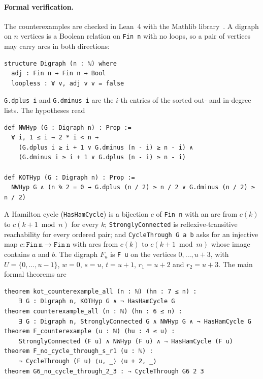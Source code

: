 \documentclass[11pt]{article}
\begin{document}
\paragraph{Formal verification.} The counterexamples are checked in Lean~4 with the Mathlib library~\cite{Lean,Mathlib}. A digraph on $n$ vertices is a Boolean relation on \texttt{Fin n} with no loops, so a pair of vertices may carry arcs in both directions:
\begin{verbatim}
structure Digraph (n : ℕ) where
  adj : Fin n → Fin n → Bool
  loopless : ∀ v, adj v v = false
\end{verbatim}
\texttt{G.dplus i} and \texttt{G.dminus i} are the $i$-th entries of the sorted out- and in-degree lists. The hypotheses read
\begin{verbatim}
def NWHyp (G : Digraph n) : Prop :=
  ∀ i, 1 ≤ i → 2 * i < n →
    (G.dplus i ≥ i + 1 ∨ G.dminus (n - i) ≥ n - i) ∧
    (G.dminus i ≥ i + 1 ∨ G.dplus (n - i) ≥ n - i)

def KOTHyp (G : Digraph n) : Prop :=
  NWHyp G ∧ (n % 2 = 0 → G.dplus (n / 2) ≥ n / 2 ∨ G.dminus (n / 2) ≥ n / 2)
\end{verbatim}
A Hamilton cycle (\texttt{HasHamCycle}) is a bijection $c$ of \texttt{Fin n} with an arc from $c(k)$ to $c(k+1 \bmod n)$ for every $k$; \texttt{StronglyConnected} is reflexive-transitive reachability for every ordered pair; and \texttt{CycleThrough G a b} asks for an injective map $c\colon\mathtt{Fin\ m}\to\mathtt{Fin\ n}$ with arcs from $c(k)$ to $c(k+1\bmod m)$ whose image contains $a$ and $b$. The digraph $F_u$ is \texttt{F u} on the vertices $0,\dots,u+3$, with $U=\{0,\dots,u-1\}$, $w=0$, $s=u$, $t=u+1$, $r_1=u+2$ and $r_2=u+3$. The main formal theorems are
\begin{verbatim}
theorem kot_counterexample_all (n : ℕ) (hn : 7 ≤ n) :
    ∃ G : Digraph n, KOTHyp G ∧ ¬ HasHamCycle G
theorem counterexample_all (n : ℕ) (hn : 6 ≤ n) :
    ∃ G : Digraph n, StronglyConnected G ∧ NWHyp G ∧ ¬ HasHamCycle G
theorem F_counterexample (u : ℕ) (hu : 4 ≤ u) :
    StronglyConnected (F u) ∧ NWHyp (F u) ∧ ¬ HasHamCycle (F u)
theorem F_no_cycle_through_s_r1 (u : ℕ) :
    ¬ CycleThrough (F u) ⟨u, _⟩ ⟨u + 2, _⟩
theorem G6_no_cycle_through_2_3 : ¬ CycleThrough G6 2 3
\end{verbatim}
\end{document}
